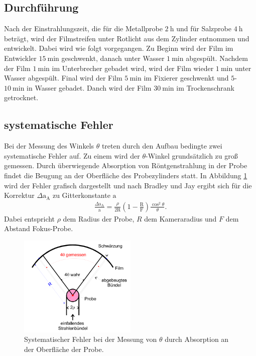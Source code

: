 \subsection{Durchführung}
\label{subsec:durch}
Nach der Einstrahlungszeit, die für die Metallprobe $\SI{2}{\hour}$ und für Salzprobe $\SI{4}{\hour}$ beträgt, wird der Filmstreifen unter Rotlicht
aus dem Zylinder entnommen und entwickelt.
Dabei wird wie folgt vorgegangen.
Zu Beginn wird der Film im Entwickler $\SI{15}{\minute}$ geschwenkt,
danach unter Wasser $\SI{1}{\minute}$ abgespült.
Nachdem der Film $\SI{1}{\minute}$ im Unterbrecher gebadet wird, wird
der Film wieder $\SI{1}{\minute}$ unter Wasser abgespült.
Final wird der Film $\SI{5}{\minute}$ im Fixierer geschwenkt und
$5$-$\SI{10}{\minute}$ in Wasser gebadet.
Danch wird der Film $\SI{30}{\minute}$ im Trockenschrank getrocknet.


\subsection{systematische Fehler}
\label{subsec:systerr}
Bei der Messung des Winkels $\theta$
treten durch den Aufbau bedingte zwei systematische Fehler auf.
Zu einem wird der $\theta$-Winkel grundsätzlich zu groß gemessen.
Durch überwiegende Absorption von Röntgenstrahlung in der Probe
findet die Beugung an der Oberfläche des
Probezylinders statt. In Abbildung \ref{fig:error1} wird
der Fehler grafisch dargestellt und nach Bradley und Jay
ergibt sich für die Korrektur
$\Delta \mathrm{a}_\mathrm{A}$
zu Gitterkonstante $\mathrm{a}$
\begin{align}
  \frac{\Delta \mathrm{a}_\mathrm{A}}{\mathrm{a}}=\frac{\rho}{2\mathrm{R}}\left(1-\frac{\mathrm{R}}{\mathrm{F}}\right)\frac{\cos^2\theta}{\theta}. \label{eqn:sys1}
\end{align}
Dabei entspricht $\rho$ dem Radius der Probe, $R$ dem Kameraradius
und $F$ dem Abstand Fokus-Probe.

 \begin{figure}
   \centering
   \includegraphics[width=0.5\textwidth]{Syst_error_1.PNG}
   \caption{Systematischer Fehler bei der Messung von $\theta$ durch
   Absorption an der Oberfläche der Probe.}
   \label{fig:error1}
  \end{figure}

